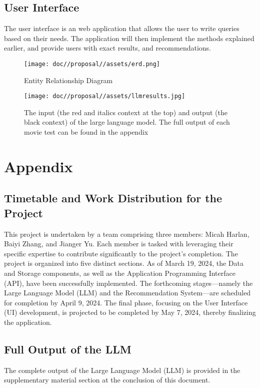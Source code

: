 \documentclass[journal]{IEEEtran}
\theoremstyle{mydefstyle}
\begin{document}
\subsection{User Interface}
The user interface is an web application that allows the user to write queries based on their needs. The application will then implement the methods explained earlier, and provide users with exact results, and recommendations.

\begin{figure}
    \centering
    \texttt{[image: doc//proposal//assets/erd.png]}
    \caption{Entity Relationship Diagram}
    \label{fig:erd}
\end{figure}
\begin{figure}
    \centering
    \texttt{[image: doc//proposal//assets/llmresults.jpg]}
    \caption{The input (the red and italics context at the top) and output (the black context) of the large language model. The full output of each movie test can be found in the appendix
}
    \label{fig:llm}
\end{figure}





\section{Appendix}
\subsection{Timetable and Work Distribution for the Project}
This project is undertaken by a team comprising three members: Micah Harlan, Baiyi Zhang, and Jianger Yu. Each member is tasked with leveraging their specific expertise to contribute significantly to the project's completion. The project is organized into five distinct sections. As of March 19, 2024, the Data and Storage components, as well as the Application Programming Interface (API), have been successfully implemented. The forthcoming stages—namely the Large Language Model (LLM) and the Recommendation System—are scheduled for completion by April 9, 2024. The final phase, focusing on the User Interface (UI) development, is projected to be completed by May 7, 2024, thereby finalizing the application.

\subsection{Full Output of the LLM}
The complete output of the Large Language Model (LLM) is provided in the supplementary material section at the conclusion of this document.
\end{document}
